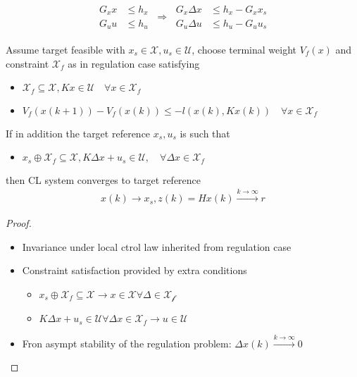 

\begin{align*}
	\begin{aligned}
		G_x  x & \leq h_x \\
		G_u  u & \leq h_u
	\end{aligned}
	\ \Rightarrow \
	\begin{aligned}
		G_x \Delta x & \leq h_x - G_x x_s \\
		G_u \Delta u & \leq h_u - G_u u_s
	\end{aligned}
\end{align*}


Assume target feasible with $x_s \in \mathcal{X}, u_s \in \mathcal{U}$,
choose terminal weight $V_f(x)$ and constraint $\mathcal{X}_f$ as in regulation case satisfying
\begin{itemize}[leftmargin=1em]
	\item $\mathcal{X}_f \subseteq \mathcal{X}, K x \in \mathcal{U} \quad \forall x \in \mathcal{X}_f$
	\item $V_f(x(k+1)) - V_f(x(k)) \leq -l (x(k), Kx(k)) \quad \forall x \in \mathcal{X}_f$
\end{itemize}
If in addition the target reference $x_s, u_s$ is such that
\begin{itemize}[leftmargin=1em]
	\item $x_s \oplus \mathcal{X}_f \subseteq \mathcal{X}, K\Delta x + u_s \in \mathcal{U}, \quad \forall \Delta x \in \mathcal{X}_f$
\end{itemize}
then CL system converges to target reference
\begin{align*}
	x(k) \to x_s, z(k) = Hx(k) \xrightarrow{k\to\infty}r
\end{align*}

\begin{proof}

	\begin{itemize}[leftmargin = 1em]
		\item Invariance under local ctrol law inherited from regulation case
		\item Constraint satisfaction provided by extra conditions
		      \begin{itemize}
			      \item $x_s \oplus \mathcal{X}_f \subseteq \mathcal{X} \to x\in \mathcal{X} \forall \Delta \in\mathcal{X_f}$
			      \item $K\Delta x + u_s \in \mathcal{U} \forall \Delta x \in \mathcal{X}_f \to u\in\mathcal{U}$
		      \end{itemize}
		\item Fron asympt stability of the regulation problem: $\Delta x (k) \xrightarrow{k\to\infty}0$
	\end{itemize}
\end{proof}

